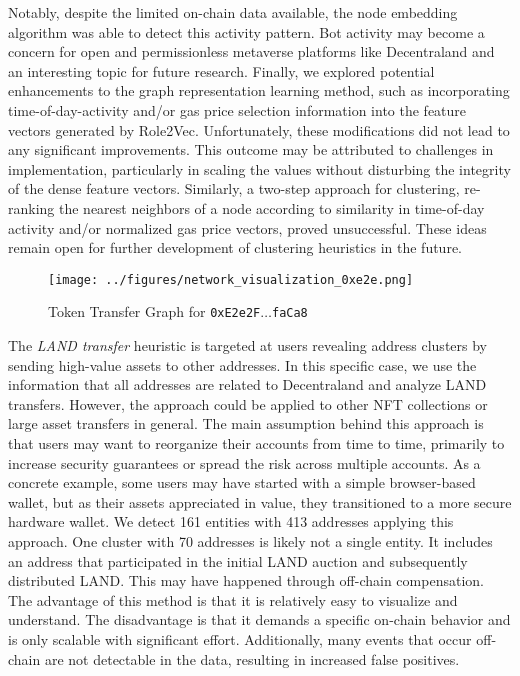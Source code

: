 \documentclass[12pt,a4paper,titlepage,oneside,english]{article}
\begin{document}
Notably, despite the limited on-chain data available, the node embedding algorithm was able to detect this activity pattern. Bot activity may become a concern for open and permissionless metaverse platforms like Decentraland and an interesting topic for future research. \newline
Finally, we explored potential enhancements to the graph representation learning method, such as incorporating time-of-day-activity and/or gas price selection information into the feature vectors generated by Role2Vec. Unfortunately, these modifications did not lead to any significant improvements. This outcome may be attributed to challenges in implementation, particularly in scaling the values without disturbing the integrity of the dense feature vectors.  
Similarly, a two-step approach for clustering, re-ranking the nearest neighbors of a node according to similarity in time-of-day activity and/or normalized gas price vectors, proved unsuccessful. These ideas remain open for further development of clustering heuristics in the future.

\begin{figure}[h!]
	\centering
	\texttt{[image: ../figures/network\_visualization\_0xe2e.png]}
	\caption{Token Transfer Graph for \texttt{0xE2e2F$\dots$faCa8}}
	\label{fig:cluster}
\end{figure}

The \textit{LAND transfer} heuristic is targeted at users revealing address clusters by sending high-value assets to other addresses. In this specific case, we use the information that all addresses are related to Decentraland and analyze LAND transfers. However, the approach could be applied to other NFT collections or large asset transfers in general. \newline
The main assumption behind this approach is that users may want to reorganize their accounts from time to time, primarily to increase security guarantees or spread the risk across multiple accounts. As a concrete example, some users may have started with a simple browser-based wallet, but as their assets appreciated in value, they transitioned to a more secure hardware wallet. We detect 161 entities with 413 addresses applying this approach. One cluster with 70 addresses is likely not a single entity. It includes an address that participated in the initial LAND auction and subsequently distributed LAND. This may have happened through off-chain compensation. The advantage of this method is that it is relatively easy to visualize and understand. The disadvantage is that it demands a specific on-chain behavior and is only scalable with significant effort. Additionally, many events that occur off-chain are not detectable in the data, resulting in increased false positives. 
\end{document}
